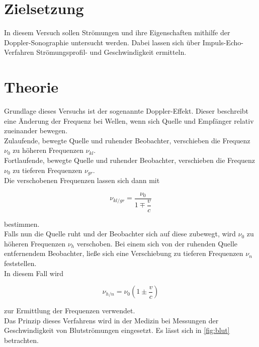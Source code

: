 \section{Zielsetzung}
\label{sec:Ziel}
In diesem Versuch sollen Strömungen und ihre Eigenschaften mithilfe der Doppler-Sonographie untersucht
werden. Dabei lassen sich über Impuls-Echo-Verfahren Strömungsprofil- und Geschwindigkeit ermitteln. 

\section{Theorie}
\label{sec:Theorie}

Grundlage dieses Versuchs ist der sogenannte Doppler-Effekt. Dieser beschreibt eine Änderung der Frequenz 
bei Wellen, wenn sich Quelle und Empfänger relativ zueinander bewegen.\\
\noindent Zulaufende, bewegte Quelle und ruhender Beobachter, verschieben die Frequenz $\nu_0$ zu höheren Frequenzen $\nu_{kl}$.\\
\noindent Fortlaufende, bewegte Quelle und ruhender Beobachter, verschieben die Frequenz  $\nu_0$ zu tieferen Frequenzen  $\nu_{gr}$.\\
\noindent Die verschobenen Frequenzen lassen sich dann mit 

\begin{equation}
    \nu_{kl/gr} = \dfrac{\nu_0}{1\mp\dfrac{v}{c}}
    \label{eq:eins}
\end{equation}

\noindent bestimmen.\\
\noindent Falls nun die Quelle ruht und der Beobachter sich auf diese zubewegt, wird  $\nu_0$ zu höheren Frequenzen $\nu_h$ verschoben. 
Bei einem sich von der ruhenden Quelle entfernendem Beobachter, ließe sich eine Verschiebung zu tieferen Frequenzen  $\nu_n$ feststellen.\\
\noindent In diesem Fall wird 

\begin{equation}
    \nu_{h/n} = \nu_0(1\pm\dfrac{v}{c})
    \label{eq:zwei}
\end{equation}

\noindent zur Ermittlung der Frequenzen verwendet.\\ 
\noindent Das Prinzip dieses Verfahrens wird in der Medizin bei Messungen der Geschwindigkeit von Blutströmungen eingesetzt.
Es lässt sich in \autoref{fig:blut} betrachten.

